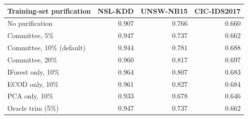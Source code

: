 \begin{tabular}{lrrr}
\toprule
Training-set purification & NSL-KDD & UNSW-NB15 & CIC-IDS2017 \\
\midrule
No purification & 0.907 & 0.766 & 0.660 \\
\midrule
Committee, 5\% & 0.947 & 0.737 & 0.662 \\
Committee, 10\% (default) & 0.944 & 0.781 & 0.688 \\
Committee, 20\% & 0.960 & 0.817 & 0.697 \\
\midrule
IForest only, 10\% & 0.964 & 0.807 & 0.683 \\
ECOD only, 10\% & 0.961 & 0.827 & 0.684 \\
PCA only, 10\% & 0.933 & 0.678 & 0.646 \\
Oracle trim (5\%) & 0.947 & 0.737 & 0.662 \\
\bottomrule
\end{tabular}